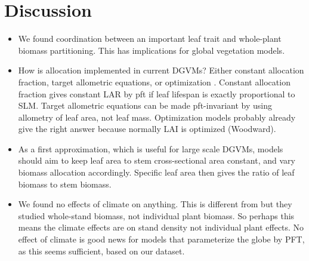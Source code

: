 \documentclass[a4paper]{article}
\begin{document}
\section{Discussion}

\begin{itemize}

\item We found coordination between an important leaf trait and whole-plant biomass partitioning. This has implications for global vegetation models.

\item How is allocation implemented in current DGVMs? Either constant allocation fraction, target allometric equations, or optimization \cite{de2014does}. Constant allocation fraction gives constant LAR by pft if leaf lifespan is exactly proportional to SLM. Target allometric equations can be made pft-invariant by using allometry of leaf area, not leaf mass. Optimization models probably already give the right answer because normally LAI is optimized (Woodward). 

\item As a first approximation, which is useful for large scale DGVMs, models should aim to keep leaf area to stem cross-sectional area constant, and vary biomass allocation accordingly. Specific leaf area then gives the ratio of leaf biomass to stem biomass. 

\item We found no effects of climate on anything. This is different from \cite{reich_temperature_2014} but they studied whole-stand biomass, not individual plant biomass. So perhaps this means the climate effects are on stand density not individual plant effects. No effect of climate is good news for models that parameterize the globe by PFT, as this seems sufficient, based on our dataset.

\end{itemize}
\end{document}
